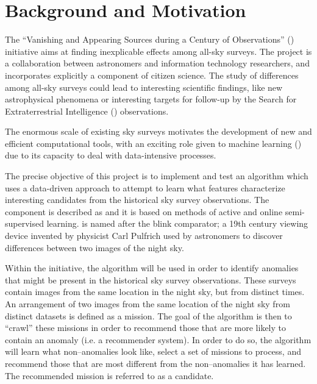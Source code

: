 \section{Background and Motivation} \label{sect:intro:background}

The ``Vanishing and Appearing Sources during a Century of Observations'' (\vasco) initiative aims at finding inexplicable effects among all-sky surveys. The \vasco project is a collaboration between astronomers and information technology researchers, and incorporates explicitly a component of citizen science. The study of differences among all-sky surveys could lead to interesting scientific findings, like new astrophysical phenomena or interesting targets for follow-up by the Search for Extraterrestrial Intelligence (\seti) observations. \newline

The enormous scale of existing sky surveys motivates the development of new and efficient computational tools, with an exciting role given to machine learning (\ml) due to its capacity to deal with data-intensive processes. \newline

The precise objective of this project is to implement and test an \ml algorithm which uses a data-driven approach to attempt to learn what features characterize interesting candidates from the historical sky survey observations. The \ml component is described as \mlblink and it is based on methods of active and online semi-supervised learning. \mlblink is named after the blink comparator; a 19th century viewing device invented by physicist Carl Pulfrich used by astronomers to discover differences between two images of the night sky. \newline

Within the \vasco initiative, the \mlblink algorithm will be used in order to identify anomalies that might be present in the historical sky survey observations. These surveys contain images from the same location in the night sky, but from distinct times. An arrangement of two images from the same location of the night sky from distinct datasets is defined as a mission. The goal of the \mlblink algorithm is then to ``crawl'' these missions in order to recommend those that are more likely to contain an anomaly (i.e. a recommender system). In order to do so, the \mlblink algorithm will learn what non--anomalies look like,  select a set of missions to process, and recommend those that are most different from the non--anomalies it has learned. The recommended mission is referred to as a candidate.